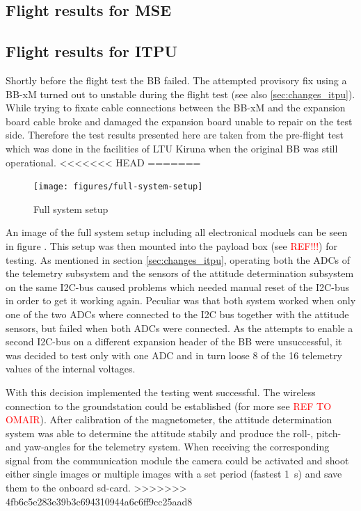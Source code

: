 \subsection{Flight results for MSE}
%

\subsection{Flight results for ITPU}
%
Shortly before the flight test the BB failed. The attempted provisory fix using a BB-xM turned out to unstable during the flight test (see also \ref{sec:changes_itpu}). While trying to fixate cable connections between the BB-xM and the expansion board cable broke and damaged the expansion board unable to repair on the test side. Therefore the test results presented here are taken from the pre-flight test which was done in the facilities of LTU Kiruna when the original BB was still operational.
<<<<<<< HEAD
=======

\begin{figure}
\centering
\texttt{[image: figures/full-system-setup]}
\caption{Full system setup}
\label{fig:FlightTest1_1}
\end{figure}

An image of the full system setup including all electronical moduels can be seen in figure . This setup was then mounted into the payload box (see \textcolor{red}{REF!!!}) for testing. As mentioned in section \ref{sec:changes_itpu}, operating both the ADCs of the telemetry subsystem and the sensors of the attitude determination subsystem on the same I2C-bus caused problems which needed manual reset of the I2C-bus in order to get it working again. Peculiar was that both system worked when only one of the two ADCs where connected to the I2C bus together with the attitude sensors, but failed when both ADCs were connected. As the attempts to enable a second I2C-bus on a different expansion header of the BB were unsuccessful, it was decided to test only with one ADC and in turn loose 8 of the 16 telemetry values of the internal voltages. 

With this decision implemented the testing went successful. The wireless connection to the groundstation could be established (for more see \textcolor{red}{REF TO OMAIR}). After calibration of the magnetometer, the attitude determination system was able to determine the attitude stabily and produce the roll-, pitch- and yaw-angles for the telemetry system. When receiving the corresponding signal from the communication module the camera could be activated and shoot either single images or multiple images with a set period (fastest 1~s) and save them to the onboard sd-card.  
>>>>>>> 4fb6c5e283e39b3c694310944a6c6ff9cc25aad8

